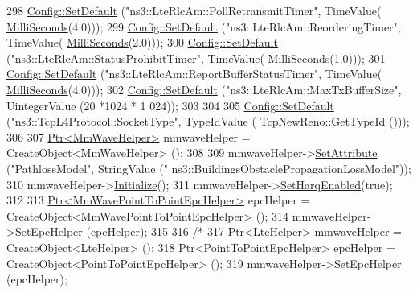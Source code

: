 \begin{DoxyCode}
298         \hyperlink{group__config_ga2e7882df849d8ba4aaad31c934c40c06}{Config::SetDefault} (\textcolor{stringliteral}{"ns3::LteRlcAm::PollRetransmitTimer"}, TimeValue(
      \hyperlink{group__timecivil_gaf26127cf4571146b83a92ee18679c7a9}{MilliSeconds}(4.0)));
299         \hyperlink{group__config_ga2e7882df849d8ba4aaad31c934c40c06}{Config::SetDefault} (\textcolor{stringliteral}{"ns3::LteRlcAm::ReorderingTimer"}, TimeValue(
      \hyperlink{group__timecivil_gaf26127cf4571146b83a92ee18679c7a9}{MilliSeconds}(2.0)));
300         \hyperlink{group__config_ga2e7882df849d8ba4aaad31c934c40c06}{Config::SetDefault} (\textcolor{stringliteral}{"ns3::LteRlcAm::StatusProhibitTimer"}, TimeValue(
      \hyperlink{group__timecivil_gaf26127cf4571146b83a92ee18679c7a9}{MilliSeconds}(1.0)));
301         \hyperlink{group__config_ga2e7882df849d8ba4aaad31c934c40c06}{Config::SetDefault} (\textcolor{stringliteral}{"ns3::LteRlcAm::ReportBufferStatusTimer"}, TimeValue(
      \hyperlink{group__timecivil_gaf26127cf4571146b83a92ee18679c7a9}{MilliSeconds}(4.0)));
302         \hyperlink{group__config_ga2e7882df849d8ba4aaad31c934c40c06}{Config::SetDefault} (\textcolor{stringliteral}{"ns3::LteRlcAm::MaxTxBufferSize"}, UintegerValue (20 *1024 * 1
      024));
303 
304 
305         \hyperlink{group__config_ga2e7882df849d8ba4aaad31c934c40c06}{Config::SetDefault} (\textcolor{stringliteral}{"ns3::TcpL4Protocol::SocketType"}, TypeIdValue (
      TcpNewReno::GetTypeId ()));
306 
307         \hyperlink{classns3_1_1Ptr}{Ptr<MmWaveHelper>} mmwaveHelper = CreateObject<MmWaveHelper> ();
308 
309         mmwaveHelper->\hyperlink{classns3_1_1ObjectBase_ac60245d3ea4123bbc9b1d391f1f6592f}{SetAttribute} (\textcolor{stringliteral}{"PathlossModel"}, StringValue (\textcolor{stringliteral}{"
      ns3::BuildingsObstaclePropagationLossModel"}));
310         mmwaveHelper->\hyperlink{classns3_1_1Object_af4411cb29971772fcd09203474a95078}{Initialize}();
311         mmwaveHelper->\hyperlink{classns3_1_1MmWaveHelper_af211a02952ab5f4eabe0219cf53e7e1c}{SetHarqEnabled}(\textcolor{keyword}{true});
312 
313         \hyperlink{classns3_1_1Ptr}{Ptr<MmWavePointToPointEpcHelper>}  epcHelper = 
      CreateObject<MmWavePointToPointEpcHelper> ();
314         mmwaveHelper->\hyperlink{classns3_1_1MmWaveHelper_a54fc98a649a710153b479d0878558733}{SetEpcHelper} (epcHelper);
315 
316         \textcolor{comment}{/*}
317 \textcolor{comment}{        Ptr<LteHelper> mmwaveHelper = CreateObject<LteHelper> ();}
318 \textcolor{comment}{        Ptr<PointToPointEpcHelper>  epcHelper = CreateObject<PointToPointEpcHelper> ();}
319 \textcolor{comment}{        mmwaveHelper->SetEpcHelper (epcHelper);}

\end{DoxyCode}
